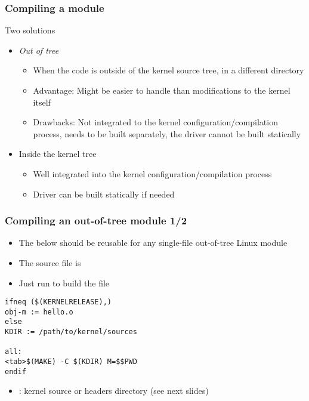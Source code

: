 \begin{frame}
  \frametitle{Compiling a module}
  Two solutions
  \begin{itemize}
  \item \emph{Out of tree}
    \begin{itemize}
    \item When the code is outside of the kernel source tree, in a
      different directory
    \item Advantage: Might be easier to handle than modifications to
      the kernel itself
    \item Drawbacks: Not integrated to the kernel
      configuration/compilation process, needs to be built
      separately, the driver cannot be built statically
    \end{itemize}
  \item Inside the kernel tree
    \begin{itemize}
    \item Well integrated into the kernel configuration/compilation
       process
    \item Driver can be built statically if needed
    \end{itemize}
  \end{itemize}
\end{frame}

\begin{frame}[fragile]
  \frametitle{Compiling an out-of-tree module 1/2}
  \begin{itemize}
  \item The below  should be reusable for any single-file
    out-of-tree Linux module
  \item The source file is 
  \item Just run  to build the  file
  \end{itemize}
{\footnotesize
\begin{block}{}
\begin{verbatim}
ifneq ($(KERNELRELEASE),)
obj-m := hello.o
else
KDIR := /path/to/kernel/sources

all:
<tab>$(MAKE) -C $(KDIR) M=$$PWD
endif
\end{verbatim}
\end{block}
}

\begin{itemize}
\item {}: kernel source or headers directory (see next slides)
\end{itemize}
\end{frame}

